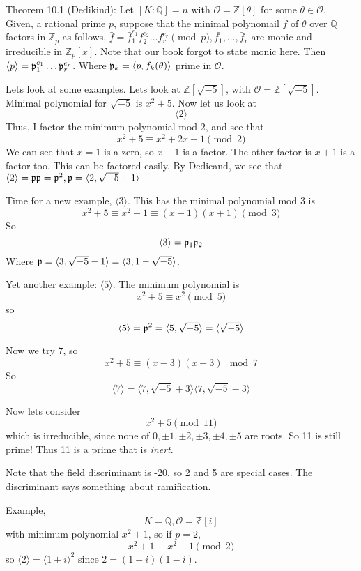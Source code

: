 \documentclass{article}
\begin{document}
Theorem 10.1 (Dedikind): Let $[K:\mathbb{Q}]=n$ with $\mathcal{O} =
\mathbb{Z}[\theta]$ for some $\theta \in \mathcal{O}$.
Given, a rational prime $p$, suppose that the minimal polynomail $f$ of $\theta$
over $\mathbb{Q}$ factors in $\mathbb{Z}_p$ as follows. $\bar{f} =
\bar{f}_1^{e_1} f_2^{e_2} \ldots f_r^{e_r} \pmod{p}, \bar{f_1},\ldots,\bar{f}_r$
are monic and irreducible in $\mathbb{Z}_p[x]$. Note that our book forgot to
state monic here. Then $\langle p \rangle =
\frak{p}_1^{e_1}\ldots\frak{p}_r^{e_r}$. Where $\frak{p}_k = \langle p,
f_k(\theta)\rangle$ prime in $\mathcal{O}$. 

Lets look at some examples. Lets look at $\mathbb{Z}[\sqrt{-5}]$, with
$\mathcal{O} = \mathbb{Z}[\sqrt{-5}]$. Minimal polynomial for $\sqrt{-5}$ is
$x^2+5$. Now let us look at 
\[ \langle 2 \rangle \]
Thus, I factor the minimum polynomial mod 2, and see that
\[ x^2 + 5 \equiv x^2 +2x+ 1\pmod{2} \]
We can see that $x=1$ is a zero, so $x-1$ is a factor. The other factor is $x+1$
is a factor too.
This can be factored easily. By Dedicand, we see that $\langle 2 \rangle =
\frak{p}\frak{p} = \frak{p}^2, \frak{p}=\langle 2, \sqrt{-5}+1 \rangle$

Time for a new example, $\langle 3 \rangle$. This has the minimal polynomial mod
3 is 
\[ x^2 + 5 \equiv x^2 - 1 \equiv (x-1)(x+1)\pmod{3}\]
So
\[ \langle 3 \rangle  = \frak{p}_1\frak{p}_2 \]
Where $\frak{p} = \langle 3, \sqrt{-5}-1\rangle = \langle 3, 1 -
\sqrt{-5}\rangle$. 

Yet another example: $\langle 5 \rangle$. The minimum polynomial is
\[ x^2 + 5 \equiv x^2 \pmod{5} \]
so
\[ \langle 5 \rangle = \frak{p}^2 = \langle 5, \sqrt{-5} \rangle = \langle
\sqrt{-5} \rangle \]

Now we try $7$, so
\[ x^2 + 5 \equiv (x - 3)(x+3) \mod{7} \]
So
\[ \langle 7 \rangle = \langle 7, \sqrt{-5}+3 \rangle \langle 7, \sqrt{-5}-3
\rangle \]

Now lets consider
\[ x^2 + 5 \pmod{11} \]
which is irreducible, since none of $0, \pm1, \pm2, \pm 3, \pm 4, \pm 5$ are
roots. So 11 is still prime! Thus 11 is a prime that is \emph{inert}.

Note that the field discriminant is -20, so 2 and 5 are special cases. The
discriminant says something about ramification. 

Example,
\[ K = \mathbb{Q}, \mathcal{O} = \mathbb{Z}[i] \]
with minimum polynomial $x^2 + 1 $, so
if $p = 2$, 
\[ x^2 + 1 \equiv x^2 - 1 \pmod{2} \]
so $\langle 2 \rangle = \langle 1+i\rangle^2$ since $2=(1-i)(1-i)$.
\end{document}

